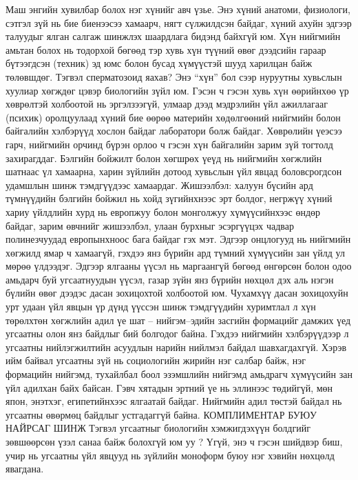 Маш энгийн хувилбар болох нэг хүнийг авч үзье. Энэ хүний анатоми, физиологи, сэтгэл зүй нь бие биенээсээ хамаарч, нягт сүлжилдсэн байдаг, хүний ахуйн эдгээр талуудыг ялган салгаж шинжлэх шаардлага бидэнд байхгүй юм. Хүн нийгмийн амьтан болох нь тодорхой бөгөөд тэр хувь хүн түүний өвөг дээдсийн гараар бүтээгдсэн (техник) эд юмс болон бусад хүмүүстэй шууд харилцан байж төлөвшдөг. Тэгвэл сперматозоид яахав? Энэ “хүн” бол сээр нуруутны хувьслын хуулиар хөгждөг цэвэр биологийн зүйл юм. Гэсэн ч гэсэн хувь хүн өөрийнхөө үр хөврөлтэй холбоотой нь эргэлзээгүй, улмаар дээд мэдрэлийн үйл ажиллагааг (психик) оролцуулаад хүний бие өөрөө материйн хөдөлгөөний нийгмийн болон байгалийн хэлбэрүүд хослон байдаг лаборатори болж байдаг.
Хөврөлийн үеэсээ гарч, нийгмийн орчинд бүрэн орлоо ч гэсэн хүн байгалийн зарим зүй тогтолд захирагддаг. Бэлгийн бойжилт болон хөгшрөх үеүд нь нийгмийн хөгжлийн шатнаас үл хамаарна, харин зүйлийн дотоод хувьслын үйл явцад боловсрогдсон удамшлын шинж тэмдгүүдээс хамаардаг. Жишээлбэл: халуун бүсийн ард түмнүүдийн бэлгийн бойжил нь хойд зүгийнхнээс эрт болдог, негржүү хүний хариу үйлдлийн хурд нь европжуу болон монголжуу хүмүүсийнхээс өндөр байдаг, зарим өвчнийг жишээлбэл, улаан бурхныг эсэргүүцэх чадвар полинезчуудад европынхноос бага байдаг гэх мэт. Эдгээр онцлогууд нь нийгмийн хөгжилд ямар ч хамаагүй, гэхдээ янз бүрийн ард түмний хүмүүсийн зан үйлд ул мөрөө үлдээдэг. Эдгээр ялгааны үүсэл нь маргаангүй бөгөөд өнгөрсөн болон одоо амьдарч буй угсаатнуудын үүсэл, газар зүйн янз бүрийн нөхцөл дэх аль нэгэн бүлийн өвөг дээдэс дасан зохицохтой холбоотой юм. Чухамхүү дасан зохицохуйн урт удаан үйл явцын үр дүнд үүссэн шинж тэмдгүүдийн хуримтлал л хүн төрөлхтөн хөгжлийн адил үе шат – нийгэм–эдийн засгийн формацийг дамжих үед угсаатны олон янз байдлыг бий болгодог байна. Гэхдээ нийгмийн хэлбэрүүдээр л угсаатны нийлэгжилтийн асуудлын нарийн нийлмэл байдал шавхагдахгүй. Хэрэв ийм байвал угсаатны зүй нь социологийн жирийн нэг салбар байж, нэг формацийн нийгэмд, тухайлбал боол эзэмшлийн нийгэмд амьдрагч хүмүүсийн зан үйл адилхан байх байсан. Гэвч хятадын эртний үе нь эллинээс төдийгүй, мөн япон, энэтхэг, египетийнхээс ялгаатай байдаг. Нийгмийн адил төстэй байдал нь угсаатны өвөрмөц байдлыг устгадаггүй байна.
КОМПЛИМЕНТАР БУЮУ НАЙРСАГ ШИНЖ
Тэгвэл угсаатныг биологийн хэмжигдэхүүн болдгийг зөвшөөрсөн үзэл санаа байж болохгүй юм уу ? Үгүй, энэ ч гэсэн шийдвэр биш, учир нь угсаатны үйл явцууд нь зүйлийн моноформ буюу нэг хэвийн нөхцөлд явагдана.
